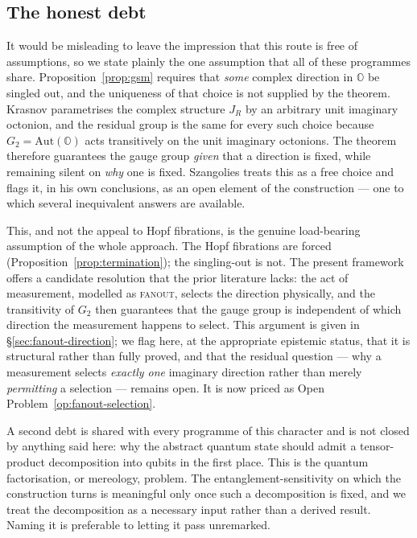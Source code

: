 \subsection{The honest debt}
\label{sec:hopf-honest-debt}

It would be misleading to leave the impression that this route is free of assumptions, so we state plainly the one assumption that all of these programmes share. Proposition~\ref{prop:gsm} requires that \emph{some} complex direction in $\mathbb{O}$ be singled out, and the uniqueness of that choice is not supplied by the theorem. Krasnov parametrises the complex structure $J_R$ by an arbitrary unit imaginary octonion, and the residual group is the same for every such choice because $G_2 = \mathrm{Aut}(\mathbb{O})$ acts transitively on the unit imaginary octonions. The theorem therefore guarantees the gauge group \emph{given} that a direction is fixed, while remaining silent on \emph{why} one is fixed. Szangolies treats this as a free choice and flags it, in his own conclusions, as an open element of the construction --- one to which several inequivalent answers are available.

This, and not the appeal to Hopf fibrations, is the genuine load-bearing assumption of the whole approach. The Hopf fibrations are forced (Proposition~\ref{prop:termination}); the singling-out is not. The present framework offers a candidate resolution that the prior literature lacks: the act of measurement, modelled as \textsc{fanout}, selects the direction physically, and the transitivity of $G_2$ then guarantees that the gauge group is independent of which direction the measurement happens to select. This argument is given in \S\ref{sec:fanout-direction}; we flag here, at the appropriate epistemic status, that it is structural rather than fully proved, and that the residual question --- why a measurement selects \emph{exactly one} imaginary direction rather than merely \emph{permitting} a selection --- remains open. It is now priced as
Open Problem~\ref{op:fanout-selection}.

A second debt is shared with every programme of this character and is not closed by anything said here: why the abstract quantum state should admit a tensor-product decomposition into qubits in the first place. This is the quantum factorisation, or mereology, problem. The entanglement-sensitivity on which the construction turns is meaningful only once such a decomposition is fixed, and we treat the decomposition as a necessary input rather than a derived result. Naming it is preferable to letting it pass unremarked.

